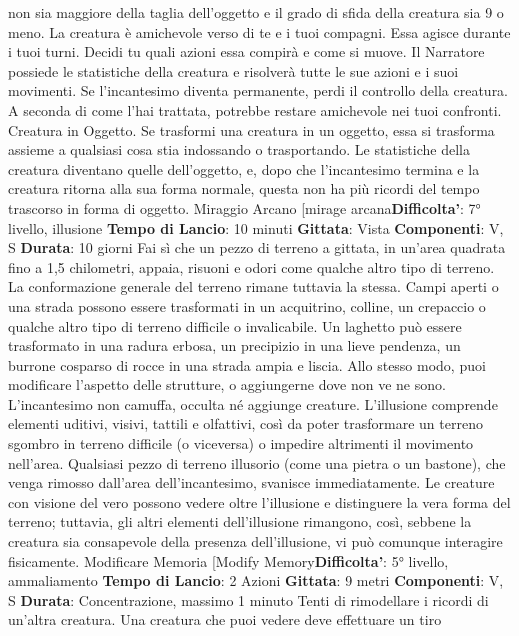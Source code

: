 \begin{multicols}{2}
non sia maggiore della taglia dell’oggetto e il grado di
sfida della creatura sia 9 o meno. La creatura è
amichevole verso di te e i tuoi compagni. Essa agisce
durante i tuoi turni. Decidi tu quali azioni essa compirà e
come si muove. Il Narratore possiede le statistiche della
creatura e risolverà tutte le sue azioni e i suoi
movimenti.
Se l’incantesimo diventa permanente, perdi il controllo
della creatura. A seconda di come l’hai trattata,
potrebbe restare amichevole nei tuoi confronti.
Creatura in Oggetto. Se trasformi una creatura in un
oggetto, essa si trasforma assieme a qualsiasi cosa stia
indossando o trasportando. Le statistiche della creatura
diventano quelle dell’oggetto, e, dopo che l’incantesimo
termina e la creatura ritorna alla sua forma normale,
questa non ha più ricordi del tempo trascorso in forma
di oggetto.
Miraggio Arcano
[mirage arcana\textbf{Difficolta'}:
7° livello, illusione
\textbf{Tempo di Lancio}: 10 minuti
\textbf{Gittata}: Vista
\textbf{Componenti}: V, S
\textbf{Durata}: 10 giorni
Fai sì che un pezzo di terreno a gittata, in un’area
quadrata fino a 1,5 chilometri, appaia, risuoni e odori
come qualche altro tipo di terreno. La conformazione
generale del terreno rimane tuttavia la stessa. Campi
aperti o una strada possono essere trasformati in un
acquitrino, colline, un crepaccio o qualche altro tipo di
terreno difficile o invalicabile. Un laghetto può essere
trasformato in una radura erbosa, un precipizio in una
lieve pendenza, un burrone cosparso di rocce in una
strada ampia e liscia.
Allo stesso modo, puoi modificare l’aspetto delle
strutture, o aggiungerne dove non ve ne sono.
L’incantesimo non camuffa, occulta né aggiunge
creature.
L’illusione comprende elementi uditivi, visivi, tattili e
olfattivi, così da poter trasformare un terreno sgombro
in terreno difficile (o viceversa) o impedire altrimenti il
movimento nell’area. Qualsiasi pezzo di terreno illusorio
(come una pietra o un bastone), che venga rimosso
dall’area dell’incantesimo, svanisce immediatamente.
Le creature con visione del vero possono vedere oltre
l’illusione e distinguere la vera forma del terreno;
tuttavia, gli altri elementi dell’illusione rimangono, così,
sebbene la creatura sia consapevole della presenza
dell’illusione, vi può comunque interagire fisicamente.
Modificare Memoria
[Modify Memory\textbf{Difficolta'}:
5° livello, ammaliamento
\textbf{Tempo di Lancio}: 2 Azioni
\textbf{Gittata}: 9 metri
\textbf{Componenti}: V, S
\textbf{Durata}: Concentrazione, massimo 1 minuto
Tenti di rimodellare i ricordi di un’altra creatura. Una
creatura che puoi vedere deve effettuare un tiro

\end{multicols}
